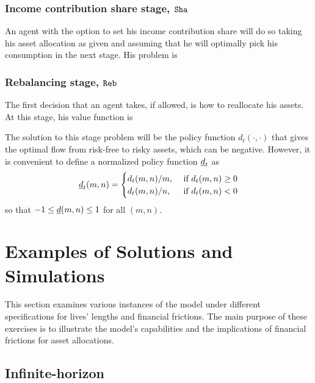 \documentclass[./RiskyContrib.tex]{subfiles}
\begin{document}
\subsubsection{Income contribution share stage, $\mathtt{Sha}$}

An agent with the option to set his income contribution share will do so
taking his asset allocation as given and assuming that he will optimally
pick his consumption in the next stage. His problem is
\begin{equation}\label{eq:bellman_sha}

\end{equation}

\subsubsection{Rebalancing stage, $\mathtt{Reb}$}

The first decision that an agent takes, if allowed, is how to reallocate his
assets. At this stage, his value function is
\begin{equation}\label{eq:bellman_reb}

\end{equation}

The solution to this stage problem will be the policy function $d_t(\cdot, \cdot)$
that gives the optimal flow from risk-free to risky assets, which can be negative.
However, it is convenient to define a normalized policy function $\underline{d}_t$ as
\begin{equation*}
\underline{d}_t(m, n) = \begin{cases}
d_t(m,n)/m, & \text{ if } d_t(m,n) \geq 0 \\
d_t(m,n)/n, & \text{ if } d_t(m,n) < 0
\end{cases}
\end{equation*}
so that $-1 \leq \underline{d}(m,n) \leq 1$ for all $(m,n)$.

\hypertarget{Examples}{}
\section{Examples of Solutions and Simulations}

This section examines various instances of the model under
different specifications for lives' lengths and financial
frictions. The main purpose of these exercises is to illustrate
the model's capabilities and the implications of financial
frictions for asset allocations.

\subsection{Infinite-horizon}
\end{document}
